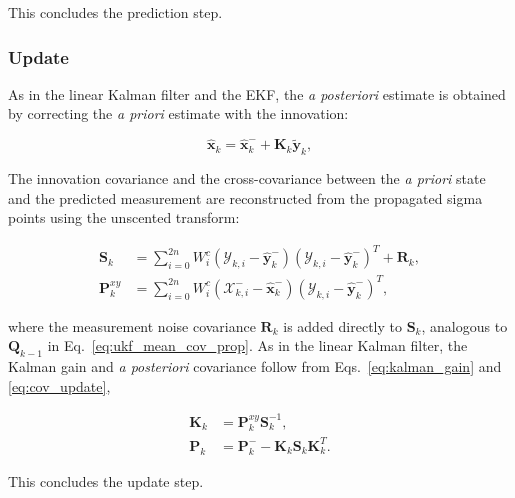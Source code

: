 This concludes the prediction step.





\subsubsection{Update}

As in the linear Kalman filter and the EKF, the \emph{a posteriori} estimate is obtained by correcting the \emph{a priori} estimate with the innovation:

\begin{equation}
	\hat{\bm{x}}_k = \hat{\bm{x}}_k^- + \bm{K}_k \tilde{\bm{y}}_k, 
	\label{eq:ukf_state_update}
\end{equation}

The innovation covariance and the cross-covariance between the \emph{a priori} state and the predicted measurement are reconstructed from the propagated sigma points using the unscented transform:

\begin{align}
	\bm{S}_k 
	&= 
	\sum_{i=0}^{2n} W_i^c \left( \bm{\mathcal{Y}}_{k,i} - \hat{\bm{y}}_k^- \right)\left( \bm{\mathcal{Y}}_{k,i} - \hat{\bm{y}}_k^- \right)^T + \bm{R}_k,
	\\[4pt]
	\bm{P}_k^{xy} 
	&= 
	\sum_{i=0}^{2n} W_i^c \left( \bm{\mathcal{X}}_{k,i}^- - \hat{\bm{x}}_k^- \right)\left( \bm{\mathcal{Y}}_{k,i} - \hat{\bm{y}}_k^- \right)^T,
	\label{eq:ukf_innovation_cov}
\end{align}

where the measurement noise covariance $\bm{R}_k$ is added directly to $\bm{S}_k$, analogous to $\bm{Q}_{k-1}$ in Eq.~\eqref{eq:ukf_mean_cov_prop}. As in the linear Kalman filter, the Kalman gain and \emph{a posteriori} covariance follow from Eqs.~\eqref{eq:kalman_gain} and \eqref{eq:cov_update},

\begin{align}
	\bm{K}_k 
	&= 
	\bm{P}_k^{xy} \bm{S}_k^{-1}, 
	\\[4pt]
	\bm{P}_k 
	&= 
	\bm{P}_k^- - \bm{K}_k \bm{S}_k \bm{K}_k^T.
	\label{eq:ukf_cov_update}
\end{align}

This concludes the update step.

